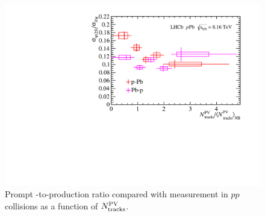 \begin{figure}[H]
    \begin{center}
	    \includegraphics[width=0.7\linewidth]{pdf/pPb/Workdir/Result/Norm.pdf}
    \end{center}
    \caption{Prompt \psitwos-to-\jpsi production ratio compared with measurement in $pp$ collisions as a function of $N^{\rm PV}_{\rm tracks}$.
      }
    \label{RPVNpp}
\end{figure}

